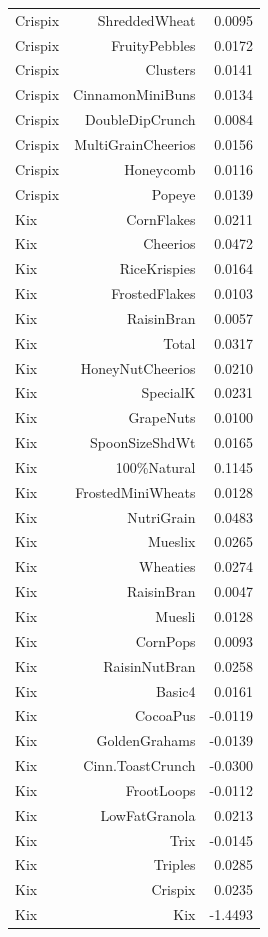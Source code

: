 \begin{longtable}{@{}lrr@{}}
Crispix & ShreddedWheat & 0.0095 \\
Crispix & FruityPebbles & 0.0172 \\
Crispix & Clusters & 0.0141 \\
Crispix & CinnamonMiniBuns & 0.0134 \\
Crispix & DoubleDipCrunch & 0.0084 \\
Crispix & MultiGrainCheerios & 0.0156 \\
Crispix & Honeycomb & 0.0116 \\
Crispix & Popeye & 0.0139 \\
Kix & CornFlakes & 0.0211 \\
Kix & Cheerios & 0.0472 \\
Kix & RiceKrispies & 0.0164 \\
Kix & FrostedFlakes & 0.0103 \\
Kix & RaisinBran & 0.0057 \\
Kix & Total & 0.0317 \\
Kix & HoneyNutCheerios & 0.0210 \\
Kix & SpecialK & 0.0231 \\
Kix & GrapeNuts & 0.0100 \\
Kix & SpoonSizeShdWt & 0.0165 \\
Kix & 100\%Natural & 0.1145 \\
Kix & FrostedMiniWheats & 0.0128 \\
Kix & NutriGrain & 0.0483 \\
Kix & Mueslix & 0.0265 \\
Kix & Wheaties & 0.0274 \\
Kix & RaisinBran & 0.0047 \\
Kix & Muesli & 0.0128 \\
Kix & CornPops & 0.0093 \\
Kix & RaisinNutBran & 0.0258 \\
Kix & Basic4 & 0.0161 \\
Kix & CocoaPus & -0.0119 \\
Kix & GoldenGrahams & -0.0139 \\
Kix & Cinn.ToastCrunch & -0.0300 \\
Kix & FrootLoops & -0.0112 \\
Kix & LowFatGranola & 0.0213 \\
Kix & Trix & -0.0145 \\
Kix & Triples & 0.0285 \\
Kix & Crispix & 0.0235 \\
Kix & Kix & -1.4493 \\

\end{longtable}

